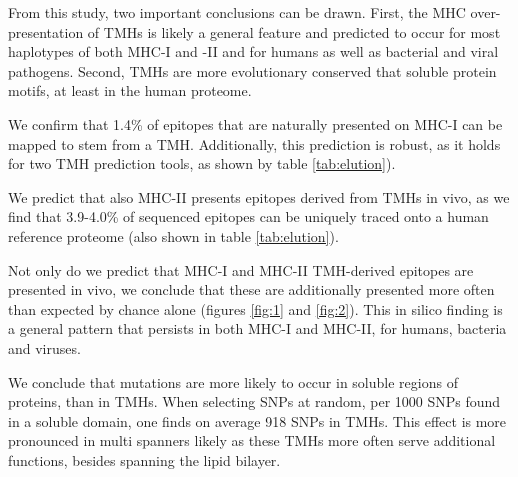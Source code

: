 From this study, two important conclusions can be drawn. 
First, the MHC over-presentation of TMHs is likely a general feature 
and predicted to occur for most haplotypes of both MHC-I and -II 
and for humans as well as bacterial and viral pathogens. 
Second, TMHs are more evolutionary conserved that soluble protein motifs, 
at least in the human proteome. 


We confirm that 1.4\% of epitopes that are naturally presented on MHC-I 
can be mapped to stem from a TMH. Additionally, this 
prediction is robust, as it holds for two TMH prediction tools, 
as shown by table \ref{tab:elution}).


We predict that also MHC-II presents epitopes derived from TMHs
in vivo, as we find that 3.9-4.0\% of sequenced epitopes
can be uniquely traced onto a human reference 
proteome (also shown in table \ref{tab:elution}).


Not only do we predict that MHC-I and MHC-II TMH-derived epitopes 
are presented in vivo, we conclude that these are additionally
presented more often than expected by chance 
alone (figures \ref{fig:1} and \ref{fig:2}).
This in silico finding is a general pattern 
that persists in both MHC-I and MHC-II, 
for humans, bacteria and viruses. 


We conclude that mutations are more likely to occur
in soluble regions of proteins, than in TMHs.
When selecting SNPs at random, per 1000 SNPs found in a soluble domain, 
one finds on average 918 SNPs in TMHs.
This effect is more pronounced in multi spanners likely as these TMHs more often serve additional functions, besides spanning the lipid bilayer. 

